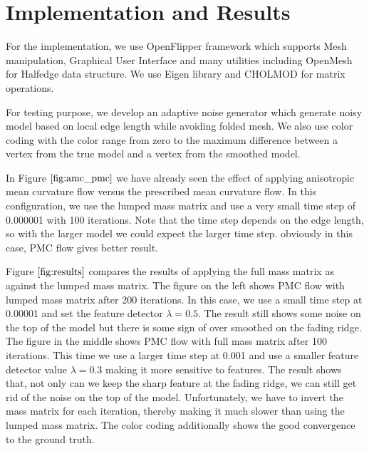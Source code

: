 \documentclass[11pt]{article}
\begin{document}
\section{Implementation and Results}

For the implementation, we use OpenFlipper framework \cite{springerlink:10.1007} which supports Mesh manipulation, Graphical User Interface and many utilities including OpenMesh \cite{Botsch02openmesh-} for Halfedge data structure. We use Eigen library \cite{eigenweb} and CHOLMOD \cite{Davis:2009:DSS:1462173.1462176} for matrix operations.

For testing purpose, we develop an adaptive noise generator which generate noisy model based on local edge length while avoiding folded mesh. We also use color coding with the color range from zero to the maximum difference between a vertex from the true model and a vertex from the smoothed model.

In Figure $\ref{fig:amc_pmc}$ we have already seen the effect of applying anisotropic mean curvature flow versus the prescribed mean curvature flow. In this configuration, we use the lumped mass matrix and use a very small time step of 0.000001 with 100 iterations. Note that the time step depends on the edge length, so with the larger model we could expect the larger time step. obviously in this case, PMC flow gives better result.

Figure $\ref{fig:results}$ compares the results of applying the full mass matrix as against the lumped mass matrix. The figure on the left shows PMC flow with lumped mass matrix after 200 iterations. In this case, we use a small time step at 0.00001 and set the feature detector $\lambda = 0.5$. The result still shows some noise on the top of the model but there is some sign of over smoothed on the fading ridge. The figure in the middle shows PMC flow with full mass matrix after 100 iterations. This time we use a larger time step at 0.001 and use a smaller feature detector value $\lambda = 0.3$ making it more sensitive to features. The result shows that, not only can we keep the sharp feature at the fading ridge, we can still get rid of the noise on the top of the model. Unfortunately, we have to invert the mass matrix for each iteration, thereby making it much slower than using the lumped mass matrix. The color coding additionally shows the good convergence to the ground truth.
\end{document}

